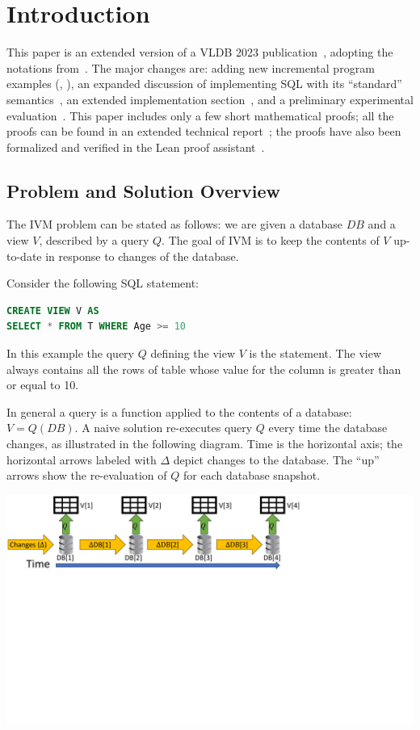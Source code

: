 \section{Introduction}\label{sec:introduction}

This paper is an extended version of a VLDB 2023
publication~\cite{budiu-vldb23}, adopting the notations
from~\cite{budiu-sigmod24}.  The major changes are: adding new
incremental program examples (,
), an expanded discussion of
implementing SQL with its ``standard'' semantics~, an
extended implementation section~, and a
preliminary experimental evaluation~.  This
paper includes only a few short mathematical proofs; all the proofs
can be found in an extended technical report~\cite{tr}; the proofs
have also been formalized and verified in the Lean proof
assistant~\cite{dbsp-theory}.

\subsection{Problem and Solution Overview}\label{sec:intro-incremental}

The IVM problem can be stated as follows: we are given a database $DB$
and a view $V$, described by a query $Q$.  The goal of IVM is to keep
the contents of $V$ up-to-date in response to changes of the database.

Consider the following SQL statement:

\begin{lstlisting}[language=SQL]
CREATE VIEW V AS
SELECT * FROM T WHERE Age >= 10
\end{lstlisting}

In this example the query $Q$ defining the view $V$ is the
 statement.  The view  always contains all the
rows of table  whose value for the column  is
greater than or equal to 10.

In general a query is a function applied to the contents of a
database: $V = Q(DB)$.  A naive solution re-executes query $Q$ every
time the database changes, as illustrated in the following diagram.
Time is the horizontal axis; the horizontal arrows labeled with
$\Delta$ depict changes to the database.  The ``up'' arrows show the
re-evaluation of $Q$ for each database snapshot.

\noindent \includegraphics[trim={0 4.8in 3.7in 0},clip,scale=.34]{view.pdf}

